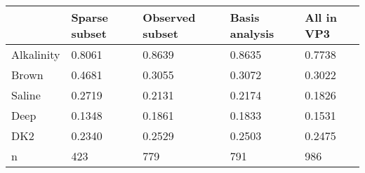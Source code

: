 \begin{tabular}{lllll}
\toprule
 & Sparse subset & Observed subset & Basis analysis & All in VP3 \\
\midrule
Alkalinity & 0.8061 & 0.8639 & 0.8635 & 0.7738 \\
Brown & 0.4681 & 0.3055 & 0.3072 & 0.3022 \\
Saline & 0.2719 & 0.2131 & 0.2174 & 0.1826 \\
Deep & 0.1348 & 0.1861 & 0.1833 & 0.1531 \\
DK2 & 0.2340 & 0.2529 & 0.2503 & 0.2475 \\
n & 423 & 779 & 791 & 986 \\
\bottomrule
\end{tabular}
